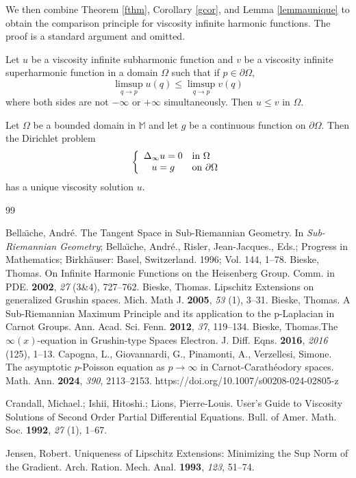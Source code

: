 \documentclass[reqno]{amsart}
\begin{document}
We then combine Theorem \ref{fthm}, Corollary \ref{gcor}, and
Lemma \ref{lemmaunique} to obtain the comparison principle for viscosity infinite
harmonic functions. The proof is a standard argument and omitted. \cite{B:HG}  
\begin{theorem}\label{infharmunique}
Let $u$ be a viscosity infinite subharmonic function and $v$ be a viscosity infinite superharmonic function in a domain $\Omega$ such that
 if $p \in \partial \Omega,$
$$\limsup_{q\rightarrow p}u(q) \leq \limsup_{q\rightarrow p}v(q)$$ where both
sides are not $-\infty$ or $+\infty$ simultaneously.  Then $u \leq v$ in $\Omega$.
\end{theorem}
\begin{corollary}
    Let $\Omega$ be a bounded domain in $\mathbb{M}$ and let $g$ be a continuous function on $\partial \Omega$. Then the Dirichlet problem 
    \begin{eqnarray*}
\left\{ \begin{array}{cl}
\Delta_{\infty}u  =  0  & \textmd{in\ } \Omega \\
u = g & \textmd{on\ } \partial \Omega
\end{array} \right.
\end{eqnarray*}
has a unique viscosity solution $u$. 
\end{corollary}


\begin{thebibliography}{99}

Bella\" {\i}che, Andr\' {e}. The Tangent Space in
Sub-Riemannian Geometry. In \emph{Sub-Riemannian Geometry};
Bella\" {\i}che, Andr\' {e}., Risler, Jean-Jacques., Eds.; 
Progress in Mathematics;  Birkh\" {a}user: Basel, Switzerland.
1996; Vol. 144, 1--78.
Bieske, Thomas. On Infinite Harmonic Functions on
the Heisenberg Group. Comm. in PDE. \textbf{2002}, \emph{27} (3\&4), 727--762.
Bieske, Thomas. Lipschitz Extensions on generalized Grushin spaces. 
Mich. Math J. \textbf{2005}, \emph{53} (1), 3--31.
Bieske, Thomas. A Sub-Riemannian Maximum Principle and its application to the p-Laplacian in Carnot Groups. Ann. Acad. Sci. Fenn. \textbf{2012}, \emph{37}, 119--134.
Bieske, Thomas.The $\infty(x)$-equation in Grushin-type Spaces
Electron. J. Diff. Eqns. \textbf{2016}, \emph{2016} (125), 1--13.
Capogna, L., Giovannardi, G., Pinamonti, A., Verzellesi, Simone. The asymptotic $p$-Poisson equation as $p\to\infty$ in Carnot-Carath\'{e}odory spaces. Math. Ann. \textbf{2024}, \emph{390}, 2113--2153. https://doi.org/10.1007/s00208-024-02805-z

Crandall, Michael.; Ishii, Hitoshi.; 
Lions, Pierre-Louis.  User's Guide to Viscosity Solutions of Second Order
Partial Differential Equations. Bull. of Amer. Math. Soc. \textbf{1992}, \emph{27} 
(1), 1--67.  

 Jensen, Robert.
Uniqueness of Lipschitz Extensions:  Minimizing the Sup Norm of the
Gradient. Arch. Ration. Mech. Anal. \textbf{1993}, \emph{123}, 51--74.

\end{thebibliography}
\end{document}
